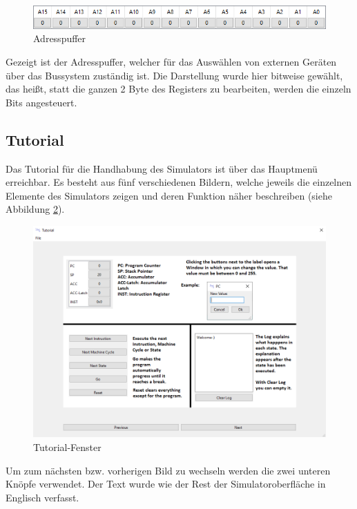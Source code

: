 \documentclass[12pt]{article}
\newcommand{\imgSpaceBefore}{\vspace{10pt}}
\begin{document}
\begin{figure}[h]
\centering
\includegraphics[width=15cm]{bilder/AddBuff}
\caption{Adresspuffer}
\label{fig:AddBuff}
\end{figure}

\noindent
Gezeigt ist der Adresspuffer, welcher für das Auswählen von externen Geräten über das Bussystem zuständig ist. Die Darstellung wurde hier bitweise gewählt, das heißt, statt die ganzen 2 Byte des Registers zu bearbeiten, werden die einzeln Bits angesteuert.

\newpage

\subsection{Tutorial}
Das Tutorial für die Handhabung des Simulators ist über das Hauptmenü erreichbar. Es besteht aus fünf verschiedenen Bildern, welche jeweils die einzelnen Elemente des Simulators zeigen und deren Funktion näher beschreiben (siehe Abbildung \ref{fig:Tutorial}).\imgSpaceBefore

\begin{figure}[h]
\centering
\includegraphics[width=15cm]{bilder/Tutorial}
\caption{Tutorial-Fenster}
\label{fig:Tutorial}
\end{figure}

\noindent
Um zum nächsten bzw. vorherigen Bild zu wechseln werden die zwei unteren Knöpfe verwendet. Der Text wurde wie der Rest der Simulatoroberfläche in Englisch verfasst.
\end{document}
